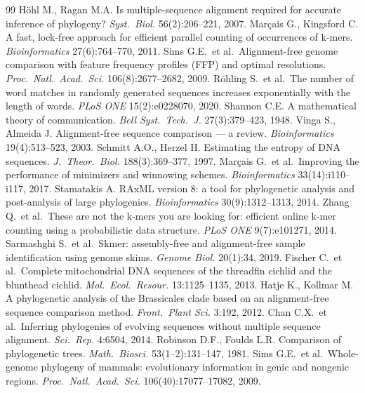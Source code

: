 \documentclass[11pt]{article}
\begin{document}
\begin{thebibliography}{99}
 H{\"o}hl M., Ragan M.A. Is multiple-sequence alignment required for accurate inference of phylogeny? \emph{Syst.\ Biol.} 56(2):206--221, 2007.
 Mar{\c{c}}ais G., Kingsford C. A fast, lock-free approach for efficient parallel counting of occurrences of k-mers. \emph{Bioinformatics} 27(6):764--770, 2011.
 Sims G.E.\ et al.\ Alignment-free genome comparison with feature frequency profiles (FFP) and optimal resolutions. \emph{Proc.\ Natl.\ Acad.\ Sci.} 106(8):2677--2682, 2009.
 R{\"o}hling S.\ et al.\ The number of word matches in randomly generated sequences increases exponentially with the length of words. \emph{PLoS ONE} 15(2):e0228070, 2020.
 Shannon C.E. A mathematical theory of communication. \emph{Bell Syst.\ Tech.\ J.} 27(3):379--423, 1948.
 Vinga S., Almeida J. Alignment-free sequence comparison --- a review. \emph{Bioinformatics} 19(4):513--523, 2003.
 Schmitt A.O., Herzel H. Estimating the entropy of DNA sequences. \emph{J.\ Theor.\ Biol.} 188(3):369--377, 1997.
 Mar{\c{c}}ais G.\ et al.\ Improving the performance of minimizers and winnowing schemes. \emph{Bioinformatics} 33(14):i110--i117, 2017.
 Stamatakis A. RAxML version 8: a tool for phylogenetic analysis and post-analysis of large phylogenies. \emph{Bioinformatics} 30(9):1312--1313, 2014.
 Zhang Q.\ et al.\ These are not the k-mers you are looking for: efficient online k-mer counting using a probabilistic data structure. \emph{PLoS ONE} 9(7):e101271, 2014.
 Sarmashghi S.\ et al.\ Skmer: assembly-free and alignment-free sample identification using genome skims. \emph{Genome Biol.} 20(1):34, 2019.
 Fischer C.\ et al.\ Complete mitochondrial DNA sequences of the threadfin cichlid and the blunthead cichlid. \emph{Mol.\ Ecol.\ Resour.} 13:1125--1135, 2013.
 Hatje K., Kollmar M. A phylogenetic analysis of the Brassicales clade based on an alignment-free sequence comparison method. \emph{Front.\ Plant Sci.} 3:192, 2012.
 Chan C.X.\ et al.\ Inferring phylogenies of evolving sequences without multiple sequence alignment. \emph{Sci.\ Rep.} 4:6504, 2014.
 Robinson D.F., Foulds L.R. Comparison of phylogenetic trees. \emph{Math.\ Biosci.} 53(1--2):131--147, 1981.
 Sims G.E.\ et al.\ Whole-genome phylogeny of mammals: evolutionary information in genic and nongenic regions. \emph{Proc.\ Natl.\ Acad.\ Sci.} 106(40):17077--17082, 2009.

\end{thebibliography}
\end{document}
